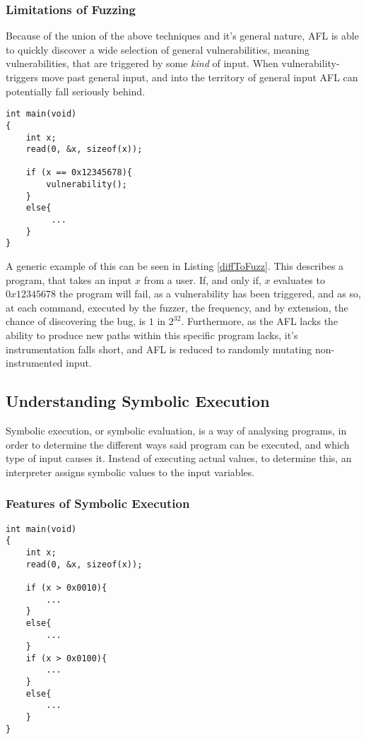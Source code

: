 \documentclass[a4paper]{article}
\newcommand{\tit}[1]{\textit{#1}}
\begin{document}
\subsubsection*{Limitations of Fuzzing}
Because of the union of the above techniques and it's general nature, AFL is able to quickly discover a wide selection of general vulnerabilities, meaning vulnerabilities, that are triggered by some \tit{kind} of input. When vulnerability-triggers move past general input, and into the territory of general input AFL can potentially fall seriously behind.
\begin{lstlisting}[caption=A program that is difficult to fuzz, label=diffToFuzz, captionpos=b]
int main(void)
{
    int x;
    read(0, &x, sizeof(x));
    
    if (x == 0x12345678){
        vulnerability();
    }
    else{
         ...
    }
}
\end{lstlisting}
A generic example of this can be seen in Listing \ref{diffToFuzz}. This describes a program, that takes an input $x$ from a user. If, and only if, $x$ evaluates to $0x12345678$ the program will fail, as a vulnerability has been triggered, and as so, at each command, executed by the fuzzer, the frequency, and by extension, the chance of discovering the bug, is $1$ in $2^{32}$. Furthermore, as the AFL lacks the ability to produce new paths within this specific program lacks, it's instrumentation falls short, and AFL is reduced to randomly mutating non-instrumented input.
\subsection{Understanding Symbolic Execution}
Symbolic execution, or symbolic evaluation, is a way of analysing programs, in order to determine the different ways said program can be executed, and which type of input causes it. Instead of executing actual values, to determine this, an interpreter assigns symbolic values to the input variables. 
\subsubsection*{Features of Symbolic Execution}
\begin{lstlisting}[caption=Example of Symbolic Execution, label=SymExExample, captionpos=b]
int main(void)
{
    int x;
    read(0, &x, sizeof(x));
    
    if (x > 0x0010){
        ...
    }
    else{
        ...
    }
    if (x > 0x0100){
        ...
    }
    else{
        ...
    }
}
\end{lstlisting}
\end{document}
